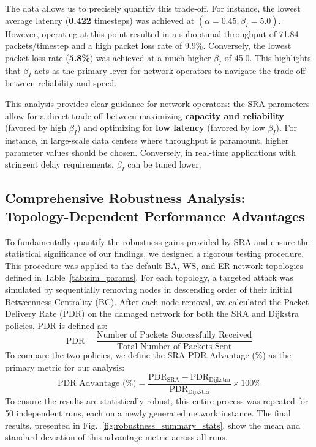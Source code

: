 \documentclass[journal]{IEEEtran}
\begin{document}
The data allows us to precisely quantify this trade-off. For instance, the lowest average latency (\textbf{0.422} timesteps) was achieved at $(\alpha=0.45, \beta_I=5.0)$. However, operating at this point resulted in a suboptimal throughput of 71.84 packets/timestep and a high packet loss rate of 9.9\%. Conversely, the lowest packet loss rate (\textbf{5.8\%}) was achieved at a much higher $\beta_I$ of 45.0. This highlights that $\beta_I$ acts as the primary lever for network operators to navigate the trade-off between reliability and speed.

This analysis provides clear guidance for network operators: the SRA parameters allow for a direct trade-off between maximizing \textbf{capacity and reliability} (favored by high $\beta_I$) and optimizing for \textbf{low latency} (favored by low $\beta_I$). For instance, in large-scale data centers where throughput is paramount, higher parameter values should be chosen. Conversely, in real-time applications with stringent delay requirements, $\beta_I$ can be tuned lower.

\subsection{Comprehensive Robustness Analysis: Topology-Dependent Performance Advantages}
\label{subsec:robustness}

To fundamentally quantify the robustness gains provided by SRA and ensure the statistical significance of our findings, we designed a rigorous testing procedure. This procedure was applied to the default BA, WS, and ER network topologies defined in Table~\ref{tab:sim_params}. For each topology, a targeted attack was simulated by sequentially removing nodes in descending order of their initial Betweenness Centrality (BC). After each node removal, we calculated the Packet Delivery Rate (PDR) on the damaged network for both the SRA and Dijkstra policies. PDR is defined as:
\begin{equation}
\label{eq:pdr}
\text{PDR} = \frac{\text{Number of Packets Successfully Received}}{\text{Total Number of Packets Sent}}
\end{equation}
To compare the two policies, we define the SRA PDR Advantage (\%) as the primary metric for our analysis:
\begin{equation}
\label{eq:pdr_advantage}
\text{PDR Advantage (\%)} = \frac{\text{PDR}_{\text{SRA}} - \text{PDR}_{\text{Dijkstra}}}{\text{PDR}_{\text{Dijkstra}}} \times 100\%
\end{equation}
To ensure the results are statistically robust, this entire process was repeated for 50 independent runs, each on a newly generated network instance. The final results, presented in Fig.~\ref{fig:robustness_summary_stats}, show the mean and standard deviation of this advantage metric across all runs.
\end{document}
